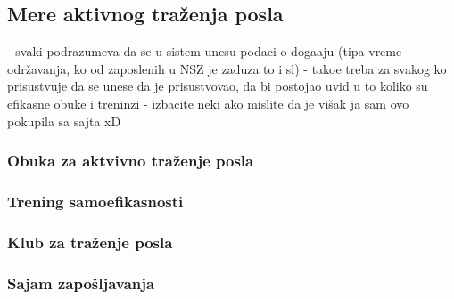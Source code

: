 \subsection{Mere aktivnog tra\v zenja posla}

- svaki podrazumeva da se u sistem unesu podaci o doga\dj aju (tipa vreme odr\v zavanja, ko od zaposlenih u NSZ je zadu\ven za to i sl)
- tako\dj e treba za svakog ko prisustvuje da se unese da je prisustvovao, da bi postojao uvid u to koliko su efikasne obuke i treninzi
- izbacite neki ako mislite da je vi\v sak ja sam ovo pokupila sa sajta  xD

\subsubsection{Obuka za aktvivno tra\v zenje posla}

\subsubsection{Trening samoefikasnosti}

\subsubsection{Klub za tra\v zenje posla}

\subsubsection{Sajam zapo\v sljavanja}